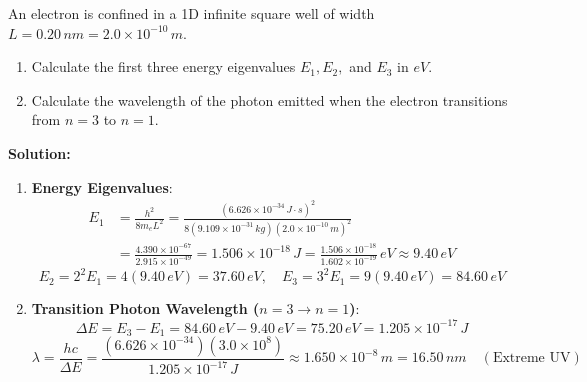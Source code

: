 \begin{example}
An electron is confined in a 1D infinite square well of width $L = 0.20\,\si{nm} = 2.0 \times 10^{-10}\,\si{m}$.
\begin{enumerate}
    \item Calculate the first three energy eigenvalues $E_1, E_2,$ and $E_3$ in $\si{eV}$.
    \item Calculate the wavelength of the photon emitted when the electron transitions from $n=3$ to $n=1$.
\end{enumerate}

\textbf{Solution:}
\begin{enumerate}
    \item \textbf{Energy Eigenvalues}:
    \begin{align*}
        E_1 &= \frac{h^2}{8 m_e L^2} = \frac{(6.626 \times 10^{-34}\,\si{J\cdot s})^2}{8(9.109 \times 10^{-31}\,\si{kg})(2.0 \times 10^{-10}\,\si{m})^2} \\
        &= \frac{4.390 \times 10^{-67}}{2.915 \times 10^{-49}} = 1.506 \times 10^{-18}\,\si{J} = \frac{1.506 \times 10^{-18}}{1.602 \times 10^{-19}}\,\si{eV} \approx 9.40\,\si{eV}
    \end{align*}
    \begin{equation*}
        E_2 = 2^2 E_1 = 4(9.40\,\si{eV}) = 37.60\,\si{eV}, \quad E_3 = 3^2 E_1 = 9(9.40\,\si{eV}) = 84.60\,\si{eV}
    \end{equation*}
    
    \item \textbf{Transition Photon Wavelength ($n=3 \to n=1$)}:
    \begin{equation*}
        \Delta E = E_3 - E_1 = 84.60\,\si{eV} - 9.40\,\si{eV} = 75.20\,\si{eV} = 1.205 \times 10^{-17}\,\si{J}
    \end{equation*}
    \begin{equation*}
        \lambda = \frac{hc}{\Delta E} = \frac{(6.626 \times 10^{-34})(3.0 \times 10^8)}{1.205 \times 10^{-17}\,\si{J}} \approx 1.650 \times 10^{-8}\,\si{m} = 16.50\,\si{nm} \quad (\text{Extreme UV})
    \end{equation*}
\end{enumerate}
\end{example}

